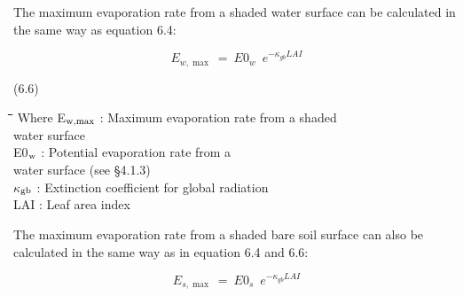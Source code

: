 \documentclass[11pt]{article}
\begin{document}
\bigskip
\bigskip
The maximum evaporation rate from a shaded water surface can be calculated in the same
way as equation 6.4: 

\begin{displaymath}
E _{w,\max } ~=~ E0 _{w} \,\,\, e ^{-\kappa  _{gb} LAI}
\end{displaymath}

 \bigskip
\strut\hfill (6.6)
\nwln
\begin{tabbing}
\hspace{1.27cm}\=\hspace{1.27cm}\=\hspace{1.27cm}\=\hspace{1.27cm}\=%
\hspace{1.27cm}\=\hspace{1.27cm}\=\hspace{1.27cm}\=\hspace{1.27cm}\=%
\hspace{1.27cm}\=\hspace{1.27cm}\=\kill
Where\> \> E$_{{\rm w,max}}$\> : Maximum evaporation rate from a shaded \\
\>\> \>   water surface\> \> \> \> \> \> \> [cm d$^{{\rm -1}}$]\\
\>\> E0$_{{\rm w}}$\> : Potential evaporation rate from a \\
\>\> \>   water surface (see \S 4.1.3)\> \> \> \> \> \> \> [cm d$^{{\rm -1}}$]\\
\>\> $\kappa$$_{{\rm gb}}$\> : Extinction coefficient for global radiation\> \> \> \> \> \> \> [-]\\
\>\> LAI\> : Leaf area index\> \> \> \> \> \> \> [ha ha$^{{\rm -1}}$]
\end{tabbing}

\bigskip
\bigskip
The maximum evaporation rate from a shaded bare soil surface can also be calculated in
the same way as in equation 6.4 and 6.6:

\begin{displaymath}
E _{s,\max } ~=~ E0 _{s} \,\,\, e ^{-\kappa  _{gb} LAI}
\end{displaymath}
\end{document}
